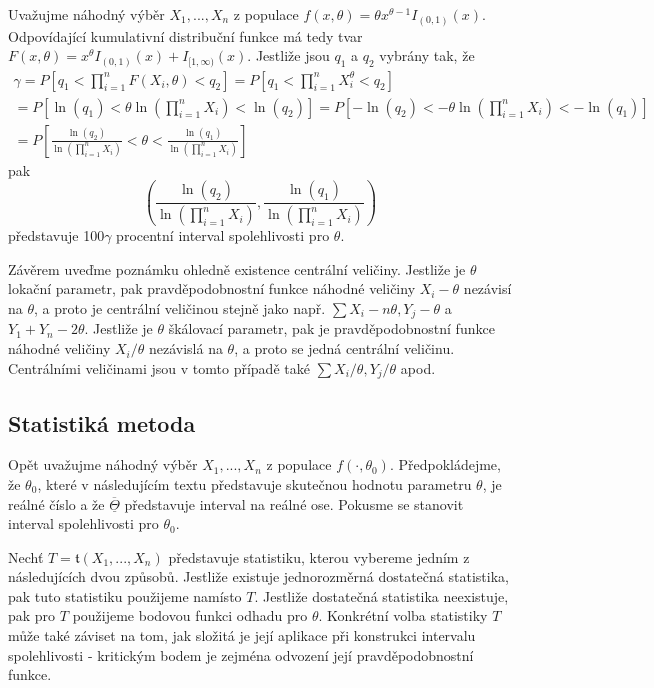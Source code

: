 \begin{example}
Uvažujme náhodný výběr $X_1, ..., X_n$ z populace $f(x, \theta) = \theta x^{\theta - 1}I_{(0, 1)}(x)$. Odpovídající kumulativní distribuční funkce má tedy tvar $F(x, \theta) = x^{\theta}I_{(0, 1)}(x) + I_{[1, \infty)}(x)$. Jestliže jsou $q_1$ a $q_2$ vybrány tak, že
\begin{gather*}
\gamma = P\left[q_1 < \prod_{i = 1}^n F(X_i, \theta) < q_2 \right] = P\left[q_1 < \prod_{i = 1}^n X_i^{\theta} < q_2 \right]\\
= P \left[\ln(q_1) < \theta \ln \left(\prod_{i = 1}^n X_i \right) < \ln(q_2)\right] = P \left[-\ln(q_2) < -\theta \ln \left(\prod_{i = 1}^n X_i \right) < -\ln(q_1) \right]\\
= P \left[\frac{\ln(q_2)}{\ln \left(\prod_{i = 1}^n X_i \right)} < \theta < \frac{\ln(q_1)}{\ln\left(\prod_{i = 1}^n X_i \right)}\right]
\end{gather*}
pak
\begin{equation*}
 \left(\frac{\ln(q_2)}{\ln \left(\prod_{i = 1}^n X_i\right)}, \frac{\ln(q_1)}{\ln\left(\prod_{i = 1}^n X_i \right)}\right)
\end{equation*}
představuje 100$\gamma$ procentní interval spolehlivosti pro $\theta$.
\end{example}

Závěrem uveďme poznámku ohledně existence centrální veličiny. Jestliže je $\theta$ lokační parametr, pak pravděpodobnostní funkce náhodné veličiny $X_i - \theta$ nezávisí na $\theta$, a proto je centrální veličinou stejně jako např. $\sum X_i - n \theta, Y_j - \theta$ a $Y_1 + Y_n - 2 \theta$. Jestliže je $\theta$ škálovací parametr, pak je pravděpodobnostní funkce náhodné veličiny $X_i / \theta$ nezávislá na $\theta$, a proto se jedná centrální veličinu. Centrálními veličinami jsou v tomto případě také $\sum X_i / \theta, Y_j / \theta$ apod.

\subsection{Statistiká metoda}

Opět uvažujme náhodný výběr $X_1, ..., X_n$ z populace $f(\cdot, \theta_0)$. Předpokládejme, že $\theta_0$, které v následujícím textu představuje skutečnou hodnotu parametru $\theta$, je reálné číslo a že $\overline{\underline{\Theta}}$ představuje interval na reálné ose. Pokusme se stanovit interval spolehlivosti pro $\theta_0$.

Nechť $T = \mathfrak{t}(X_1, ..., X_n)$ představuje statistiku, kterou vybereme jedním z následujících dvou způsobů. Jestliže existuje jednorozměrná dostatečná statistika, pak tuto statistiku použijeme namísto $T$. Jestliže dostatečná statistika neexistuje, pak pro $T$ použijeme bodovou funkci odhadu pro $\theta$. Konkrétní volba statistiky $T$ může také záviset na tom, jak složitá je její aplikace při konstrukci intervalu spolehlivosti - kritickým bodem je zejména odvození její pravděpodobnostní funkce.

